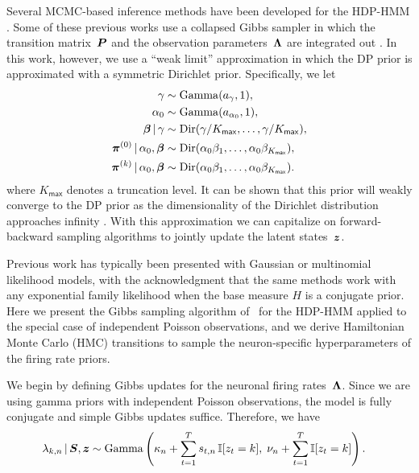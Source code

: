 Several MCMC-based inference methods have been developed for the
HDP-HMM \citep{Teh06,van08}. Some of these previous works use a
collapsed Gibbs sampler in which the transition matrix~$\boldsymbol{P}$ and the
observation parameters~$\boldsymbol{\Lambda}$ are integrated out
\citep{Teh06,van08}. In this work, however, we use a ``weak limit''
approximation in which the DP prior is approximated with a symmetric
Dirichlet prior. Specifically, we let
\begin{align}
\label{eq:hdphmm_trans}
\gamma &\sim \mathrm{Gamma}(a_\gamma, 1), \\
\nonumber \alpha_0 &\sim \mathrm{Gamma}(a_{\alpha_0}, 1), \\
\nonumber \boldsymbol{\beta} \,|\, \gamma &\sim \mathrm{Dir}(\gamma/K_{\mathsf{max}}, \ldots, \gamma/K_{\mathsf{max}}), \\
\nonumber \boldsymbol{\pi}^{(0)} \,|\, \alpha_0, \boldsymbol{\beta} &\sim \mathrm{Dir}(\alpha_0 \beta_1, \ldots, \alpha_0 \beta_{K_{\mathsf{max}}}), \\
\nonumber \boldsymbol{\pi}^{(k)} \,|\, \alpha_0, \boldsymbol{\beta} &\sim \mathrm{Dir}(\alpha_0 \beta_1, \ldots, \alpha_0 \beta_{K_{\mathsf{max}}}).
\end{align}
where $K_{\mathsf{max}}$ denotes a truncation level.  It can be
shown that this prior will weakly converge to the DP prior as the
dimensionality of the Dirichlet distribution approaches infinity
\citep{Johnson14, Ishwaran02}. With this approximation we can
capitalize on forward-backward sampling algorithms to jointly update
the latent states~$\boldsymbol{z}$.

Previous work has typically been presented with Gaussian or
multinomial likelihood models, with the acknowledgment that the same
methods work with any exponential family likelihood when the base
measure $H$ is a conjugate prior.  Here we present the Gibbs sampling
algorithm of~\citep{Teh06} for the HDP-HMM applied to the special case
of independent Poisson observations, and we derive Hamiltonian Monte
Carlo (HMC)  \citep{Neal10} transitions to sample the neuron-specific hyperparameters of
the firing rate priors.

We begin by defining Gibbs updates for the neuronal firing
rates~$\boldsymbol{\Lambda}$. Since we are using gamma priors with independent
Poisson observations, the model is fully conjugate and simple Gibbs
updates suffice. Therefore, we have
\begin{align*}
\lambda_{k,n} \,|\, \boldsymbol{S}, \boldsymbol{z} 
  &\sim \mathrm{Gamma} \left(
    \kappa_n + \sum_{t=1}^T s_{t,n} \, \mathbb{I}[z_t=k], \; 
    \nu_n + \sum_{t=1}^T \mathbb{I}[z_t=k]
    \right).
\end{align*}

